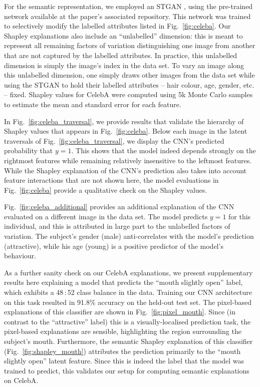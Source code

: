 \documentclass{article}
\DeclareRobustCommand{\Fig}[1]{Fig.~\ref{fig:#1}}
\begin{document}
For the semantic representation, we employed an STGAN \citep{Stgan}, using the pre-trained network available at the paper's associated repository. This network was trained to selectively modify the labelled attributes listed in \Fig{celeba}. Our Shapley explanations also include an ``unlabelled'' dimension: this is meant to represent all remaining factors of variation distinguishing one image from another that are not captured by the labelled attributes. In practice, this unlabelled dimension is simply the image's index in the data set. To vary an image along this unlabelled dimension, one simply draws other images from the data set while using the STGAN to hold their labelled attributes -- hair colour, age, gender, etc. -- fixed. Shapley values for CelebA were computed using 5k Monte Carlo samples to estimate the mean and standard error for each feature.

In \Fig{celeba_traversal}, we provide results that validate the hierarchy of Shapley values that appears in \Fig{celeba}. Below each image in the latent traversals of \Fig{celeba_traversal}, we  display the CNN's predicted probability that $y=1$. This shows that the model indeed depends strongly on the rightmost features while remaining relatively insensitive to the leftmost features. While the Shapley explanation of the CNN's prediction also takes into account feature interactions that are not shown here, the model evaluations in \Fig{celeba} provide a qualitative check on the Shapley values. 

\Fig{celeba_additional} provides an additional explanation of the CNN evaluated on a different image in the data set. The model predicts $y=1$ for this individual, and this is attributed in large part to the unlabelled factors of variation. The subject's gender (male) anti-correlates with the model's prediction (attractive), while his age (young) is a positive predictor of the model's behaviour.

As a further sanity check on our CelebA explanations, we present supplementary results here explaining a model that predicts the ``mouth slightly open'' label, which exhibits a 48\,:\,52 class balance in the data. Training our CNN architecture on this task resulted in 91.8\% accuracy on the held-out test set. The pixel-based explanations of this classifier are shown in \Fig{pixel_mouth}. Since (in contrast to the ``attractive'' label) this is a visually-localised prediction task, the pixel-based explanations are sensible, highlighting the region surrounding the subject's mouth. Furthermore, the semantic Shapley explanation of this classifier (\Fig{shapley_mouth}) attributes the prediction primarily to the ``mouth slightly open'' latent feature. Since this is indeed the label that the model was trained to predict, this validates our setup for computing semantic explanations on CelebA.
\end{document}
